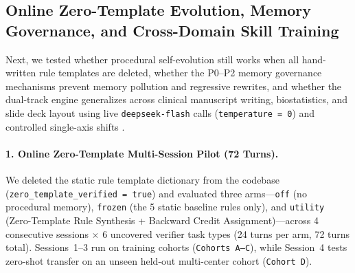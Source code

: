 \documentclass[11pt,a4paper]{article}
\begin{document}
\subsection{Online Zero-Template Evolution, Memory Governance, and Cross-Domain Skill Training}
Next, we tested whether procedural self-evolution still works when all hand-written rule templates are deleted, whether the P0--P2 memory governance mechanisms prevent memory pollution and regressive rewrites, and whether the dual-track engine generalizes across clinical manuscript writing, biostatistics, and slide deck layout using live \texttt{deepseek-flash} calls (\texttt{temperature = 0}) and controlled single-axis shifts \cite{memtransfer2026}.

\paragraph{1. Online Zero-Template Multi-Session Pilot (72 Turns).}
We deleted the static rule template dictionary from the codebase (\texttt{zero\_template\_verified = true}) and evaluated three arms---\texttt{off} (no procedural memory), \texttt{frozen} (the 5 static baseline rules only), and \texttt{utility} (Zero-Template Rule Synthesis + Backward Credit Assignment)---across 4 consecutive sessions $\times$ 6 uncovered verifier task types (24 turns per arm, 72 turns total). Sessions~1--3 run on training cohorts (\texttt{Cohorts A--C}), while Session~4 tests zero-shot transfer on an unseen held-out multi-center cohort (\texttt{Cohort D}).
\end{document}
